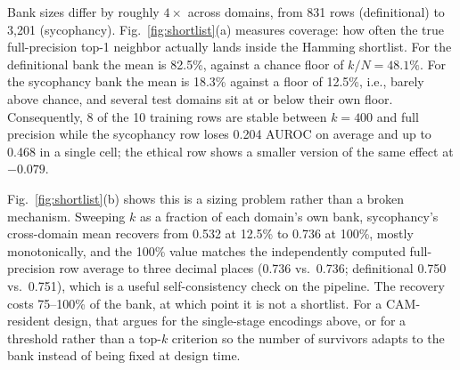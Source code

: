 \documentclass[conference]{IEEEtran}
\newcommand{\cam}{{CAM}\xspace}
\newcommand{\auroc}{{AUROC}\xspace}
\begin{document}
Bank sizes differ by roughly $4\times$ across domains, from 831 rows
(definitional) to 3{,}201 (sycophancy). Fig.~\ref{fig:shortlist}(a)
measures coverage: how often the true full-precision top-1 neighbor
actually lands inside the Hamming shortlist. For the definitional bank
the mean is 82.5\%, against a chance floor of $k/N = 48.1\%$. For the
sycophancy bank the mean is 18.3\% against a floor of 12.5\%, i.e.,
barely above chance, and several test domains sit at or below their own
floor. Consequently, 8 of the 10 training rows are stable between $k=400$
and full precision while the sycophancy row loses 0.204 \auroc on
average and up to 0.468 in a single cell; the ethical row shows a smaller
version of the same effect at $-0.079$.

Fig.~\ref{fig:shortlist}(b) shows this is a sizing problem rather than a
broken mechanism. Sweeping $k$ as a fraction of each domain's own bank,
sycophancy's cross-domain mean recovers from 0.532 at 12.5\% to 0.736 at
100\%, mostly monotonically, and the 100\% value matches the
independently computed full-precision row average to three decimal places
(0.736 vs.\ 0.736; definitional 0.750 vs.\ 0.751), which is a useful
self-consistency check on the pipeline. The recovery costs 75--100\% of
the bank, at which point it is not a shortlist. For a \cam-resident
design, that argues for the single-stage encodings above, or for a
threshold rather than a top-$k$ criterion so the number of survivors
adapts to the bank instead of being fixed at design time.
\end{document}
